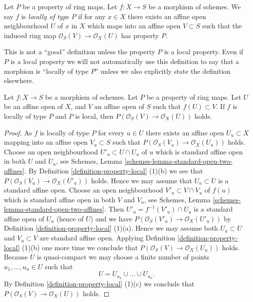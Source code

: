 \begin{definition}
\label{definition-locally-P}
Let $P$ be a property of ring maps.
Let $f : X \to S$ be a morphism of schemes.
We say $f$ is {\it locally of type $P$} if for any $x \in X$
there exists an affine open neighbourhood $U$ of $x$
in $X$ which maps into an affine open $V \subset S$ such that
the induced ring map $\mathcal{O}_S(V) \to \mathcal{O}_X(U)$
has property $P$.
\end{definition}

\noindent
This is not a ``good'' definition unless the property $P$ is
a local property. Even if $P$ is a local property we will not
automatically use this definition to say that a morphism is
``locally of type $P$'' unless we also explicitly state the
definition elsewhere.

\begin{lemma}
\label{lemma-locally-P}
Let $f : X \to S$ be a morphism of schemes.
Let $P$ be a property of ring maps.
Let $U$ be an affine open of $X$,
and $V$ an affine open of $S$ such that
$f(U) \subset V$.
If $f$ is locally of type $P$ and $P$ is local,
then $P(\mathcal{O}_S(V) \to \mathcal{O}_X(U))$ holds.
\end{lemma}

\begin{proof}
As $f$ is locally of type $P$ for every $u \in U$ there exists an
affine open $U_u \subset X$ mapping into an affine open $V_u \subset S$
such that $P(\mathcal{O}_S(V_u) \to \mathcal{O}_X(U_u))$ holds.
Choose an open neighbourhood $U'_u \subset U \cap U_u$ of $u$
which is standard affine open in both $U$ and $U_u$, see
Schemes, Lemma \ref{schemes-lemma-standard-open-two-affines}.
By Definition \ref{definition-property-local} (1)(b)
we see that $P(\mathcal{O}_S(V_u) \to \mathcal{O}_X(U'_u))$ holds.
Hence we may assume that $U_u \subset U$ is a standard affine open.
Choose an open neighbourhood $V'_u \subset V \cap V_u$
of $f(u)$ which is standard affine open in both $V$ and $V_u$, see
Schemes, Lemma \ref{schemes-lemma-standard-open-two-affines}.
Then $U'_u = f^{-1}(V'_u) \cap U_u$ is a standard affine open
of $U_u$ (hence of $U$) and we have
$P(\mathcal{O}_S(V'_u) \to \mathcal{O}_X(U'_u))$ by
Definition \ref{definition-property-local} (1)(a).
Hence we may assume both $U_u \subset U$ and $V_u \subset V$
are standard affine open. Applying
Definition \ref{definition-property-local} (1)(b)
one more time we conclude that $P(\mathcal{O}_S(V) \to \mathcal{O}_X(U_u))$
holds. Because $U$ is quasi-compact we may choose a finite number
of points $u_1, \ldots, u_n \in U$ such that
$$
U = U_{u_1} \cup \ldots \cup U_{u_n}.
$$
By Definition \ref{definition-property-local} (1)(c)
we conclude that $P(\mathcal{O}_S(V) \to \mathcal{O}_X(U))$ holds.
\end{proof}

